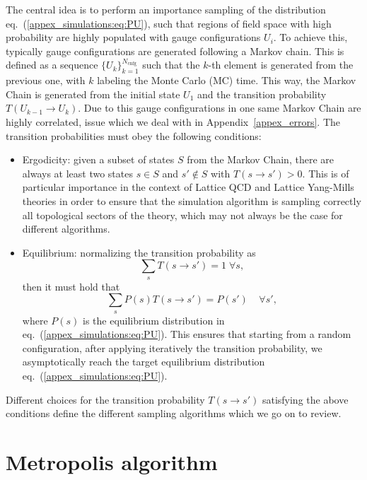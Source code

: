 The central idea is to perform an importance sampling of the distribution eq.~(\ref{appex_simulations:eq:PU}), such that regions of field space with high probability are highly populated with gauge configurations $U_i$.  To achieve this, typically gauge configurations are generated following a Markov chain. This is defined as a sequence $\{U_k\}_{k=1}^{N_{\textrm{cnfg}}}$ such that the $k$-th element is generated from the previous one, with $k$ labeling the Monte Carlo (MC) time. This way, the Markov Chain is generated from the initial state $U_1$ and the transition probability $T(U_{k-1}\rightarrow U_k)$. Due to this gauge configurations in one same Markov Chain are highly correlated, issue which we deal with in Appendix~\ref{appex_errors}. The transition probabilities must obey the following conditions:
\begin{itemize}
\item Ergodicity: given a subset of states $S$ from the Markov Chain, there are always at least two states $s\in S$ and $s'\notin S$ with $T(s\rightarrow s')>0$. This is of particular importance in the context of Lattice QCD and Lattice Yang-Mills theories in order to ensure that the simulation algorithm is sampling correctly all topological sectors of the theory, which may not always be the case for different algorithms.
\item Equilibrium: normalizing the transition probability as
\begin{equation}
\sum_sT(s\rightarrow s')=1\;\forall s,
\end{equation}
then it must hold that
\begin{equation}
\sum_sP(s)T(s\rightarrow s')=P(s')\;\;\;\;\forall s',
\end{equation}
where $P(s)$ is the equilibrium distribution in eq.~(\ref{appex_simulations:eq:PU}). This ensures that starting from a random configuration, after applying iteratively the transition probability, we asymptotically reach the target equilibrium distribution eq.~(\ref{appex_simulations:eq:PU}). 
\end{itemize}

Different choices for the transition probability $T(s\rightarrow s')$ satisfying the above conditions define the different sampling algorithms which we go on to review. 

\section{Metropolis algorithm}

